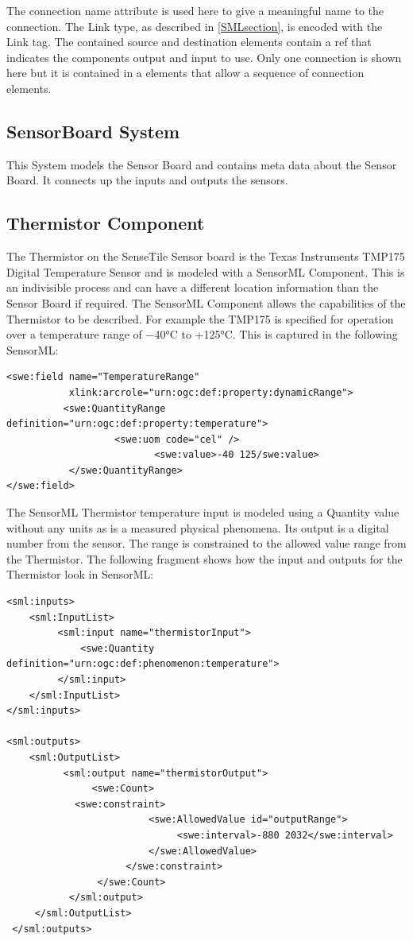\documentclass[]{final_report}
\begin{document}
The connection name attribute is used here to give a meaningful name to the connection. The Link type, as described in \ref{SMLsection}, is encoded with the Link tag. The contained source and destination elements contain a ref that indicates the components output and input to use. Only one connection is shown here but it is contained in a elements that allow a sequence of connection elements. 
  
\subsection{SensorBoard System}

This System models the Sensor Board and contains meta data about the Sensor Board. It connects up the inputs and outputs the sensors.

\subsection{Thermistor Component}
The Thermistor on the SenseTile Sensor board is the Texas Instruments TMP175 Digital Temperature Sensor and is modeled with a SensorML Component. This is an indivisible process and can have a different location information than the Sensor Board if required. The SensorML Component allows the capabilities of the Thermistor to be described. For example the TMP175 is  specified for operation over a temperature range of −40°C to +125°C. This is captured in the following SensorML:

\begin{lstlisting}
<swe:field name="TemperatureRange" 
           xlink:arcrole="urn:ogc:def:property:dynamicRange">
          <swe:QuantityRange definition="urn:ogc:def:property:temperature">
                   <swe:uom code="cel" /> 
                          <swe:value>-40 125/swe:value> 
           </swe:QuantityRange>
</swe:field>
\end{lstlisting}

The SensorML Thermistor temperature input is modeled using a Quantity value without any units as is a measured physical phenomena. Its output is a digital number from the sensor. The range is constrained to the allowed value range from the Thermistor. The following fragment shows how the input and outputs for the Thermistor look in SensorML:

\begin{lstlisting}
<sml:inputs>
    <sml:InputList>
         <sml:input name="thermistorInput">
             <swe:Quantity definition="urn:ogc:def:phenomenon:temperature">
         </sml:input>
    </sml:InputList>
</sml:inputs>

<sml:outputs>
    <sml:OutputList>
          <sml:output name="thermistorOutput">
               <swe:Count>
	        <swe:constraint>
                         <swe:AllowedValue id="outputRange">
                              <swe:interval>-880 2032</swe:interval>
                         </swe:AllowedValue>
                     </swe:constraint>
                </swe:Count>
           </sml:output>
     </sml:OutputList>
 </sml:outputs>
\end{lstlisting}
\end{document}
